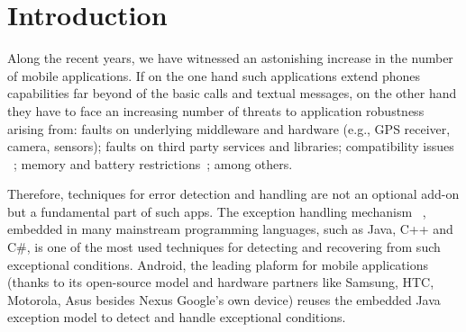 \documentclass[conference]{IEEEtran}
\begin{document}



\section{Introduction}

Along the recent years, we have witnessed an astonishing increase in the number of
mobile applications. If on the one hand such applications extend phones capabilities 
far beyond of the basic calls and textual messages, on the other hand
they have to face an increasing number of threats to application robustness
 arising from: faults on underlying middleware and hardware (e.g., GPS receiver, camera, sensors);
faults on third party services and libraries; compatibility issues ~\cite{McDon13}; 
 memory and battery restrictions~\cite{Zhang12}; among others. 

Therefore, techniques for error detection and handling are not  an optional add-on but a 
fundamental part of such apps. The exception handling mechanism ~\cite{goodenough1975exception},
embedded in many mainstream programming languages, such as Java, C++ and C\#,
 is one of the most used techniques for detecting and recovering from such exceptional conditions. 
Android, the leading plaform for mobile applications~\cite{gartner} (thanks to its open-source 
model and hardware partners like Samsung, HTC, Motorola, Asus besides Nexus Google's
 own device)  reuses the embedded Java exception model to detect and handle 
 exceptional conditions.
\end{document}
